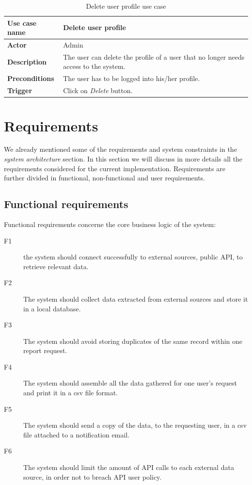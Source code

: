 \begin{table}[!h]
\centering
\begin{tabular}{l p{9cm}}  
\toprule
\bf{Use case name}    & Delete user profile \\
\midrule
\bf{Actor}    & Admin \\
\midrule
\bf{Description}    & The user can delete the profile of a user that no longer
needs access to the system.
\\
\midrule
\bf{Preconditions}    & The user has to be logged into his/her profile.
\\
\midrule
\bf{Trigger}    & Click on \emph{Delete} button. \\
\bottomrule
\end{tabular}
\caption{Delete user profile use case}
\end{table}

\section{Requirements}
We already mentioned some of the requirements and system constraints in the
\emph{system architecture} section. In this section we will discuss in more
details all the requirements considered for the current implementation.
Requirements are further divided in functional, non-functional and user
requirements.

\subsection{Functional requirements}
Functional requirements concerne the core business logic of the system:
\begin{description}
\item[F1] the system should connect successfully to external sources, public
API, to retrieve relevant data.
\item[F2] The system should collect data extracted from external sources and
store it in a local database.
\item[F3] The system should avoid storing duplicates of the same record within
one report request.
\item[F4] The system should assemble all the data gathered for one user's
request and print it in a csv file format.
\item[F5] The system should send a copy of the data, to the requesting user, in
a csv file attached to a notification email.
\item[F6] The system should limit the amount of API calls to each external data
source, in order not to breach API user policy.
\end{description}

